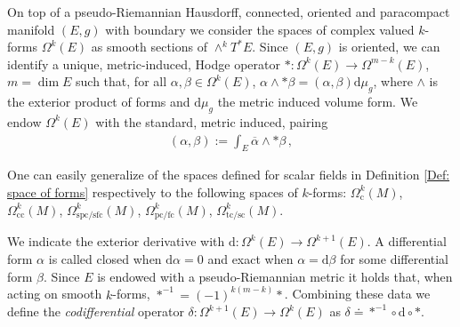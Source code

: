 On top of a pseudo-Riemannian Hausdorff, connected, oriented and paracompact manifold $(E,g)$ with boundary we consider the spaces of complex valued $k$-forms $\Omega^k(E)$ as smooth sections of $\wedge^kT^*E$. Since $(E,g)$ is oriented, we can identify a unique, metric-induced, Hodge operator $\ast:\Omega^k(E)\to\Omega^{m-k}(E)$, $m=\dim E$ such that, for all $\alpha,\beta\in\Omega^k(E)$, $\alpha\wedge\ast\beta=(\alpha,\beta)\mathrm{d}\mu_g$, where $\wedge$ is the exterior product of forms and $\mathrm{d}\mu_g$ the metric induced volume form. We endow $\Omega^k(E)$ with the standard, metric induced, pairing
\begin{align}
(\alpha,\beta):=\int_E\overline{\alpha}\wedge\ast\beta\,,
\end{align}


\begin{remark}
	One can easily generalize of the spaces defined for scalar fields in Definition \ref{Def: space of forms} respectively to the following spaces of $k$-forms: $\Omega_\mathrm{c}^k(M)$, $\Omega_{\mathrm{cc}}^k(M)$, $\Omega_{\mathrm{spc}/\mathrm{sfc}}^k(M)$, $\Omega_{\mathrm{pc}/\mathrm{fc}}^k(M)$, $\Omega_{\mathrm{tc}/\mathrm{sc}}^k(M)$.
\end{remark}


We indicate the exterior derivative with $\mathrm{d}:\Omega^k(E)\to\Omega^{k+1}(E)$. A differential form $\alpha$ is called closed when $\mathrm{d}\alpha=0$ and exact when $\alpha=\mathrm{d}\beta$ for some differential form $\beta$. Since $E$ is endowed with a pseudo-Riemannian metric it holds that, when acting on smooth $k$-forms, $\ast^{-1}=(-1)^{k(m-k)}\ast$. Combining these data we define the {\em codifferential} operator $\delta:\Omega^{k+1}(E)\to\Omega^k(E)$ as $\delta\doteq\ast^{-1}\circ \mathrm{d}\circ\ast$.

%
%



